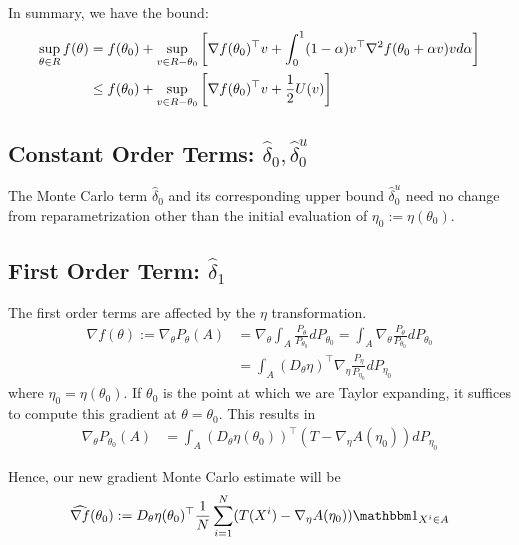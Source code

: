 \documentclass[10pt]{article}
\begin{document}
In summary, we have the bound:
\begin{align*}
    \sup\limits_{\theta \in R}
    f(\theta)
    &=
    f(\theta_0)
    +
    \sup\limits_{v \in R-\theta_0}
    \bracket{%
        \nabla f(\theta_0)^\top v
        +
        \int_0^1 (1-\alpha)
        v^\top \nabla^2 f(\theta_0 + \alpha v) v 
        d\alpha
    }
    \\&\leq
    f(\theta_0)
    +
    \sup\limits_{v \in R-\theta_0}
    \bracket{%
        \nabla f(\theta_0)^\top v
        +
        \frac{1}{2} U(v)
    }
\end{align*}

\subsection{Constant Order Terms: $\hat{\delta}_0, \hat{\delta}_0^u$}

The Monte Carlo term $\hat{\delta}_0$ and its corresponding upper bound
$\hat{\delta}_0^u$ need no change from reparametrization
other than the initial evaluation of $\eta_0 := \eta(\theta_0)$.

\subsection{First Order Term: $\hat{\delta}_1$}

The first order terms are affected by the $\eta$ transformation.
\begin{align*}
    \nabla f(\theta)
    :=
    \nabla_{\theta} P_\theta(A) 
    &=
    \nabla_{\theta} \int_A \frac{P_{\theta}}{P_{\theta_0}} dP_{\theta_0}
    =
    \int_A \nabla_{\theta} \frac{P_{\theta}}{P_{\theta_0}} dP_{\theta_0}
    \\&=
    \int_A (D_{\theta}\eta)^\top 
    \nabla_{\eta} \frac{P_{\eta}}{P_{\eta_0}} dP_{\eta_0}
\end{align*}
where $\eta_0 = \eta(\theta_0)$.
If $\theta_0$ is the point at which we are Taylor expanding,
it suffices to compute this gradient at $\theta = \theta_0$.
This results in
\begin{align*}
    \nabla_{\theta} P_{\theta_0}(A) 
    &=
    \int_A (D_{\theta}\eta(\theta_0))^\top (T - \nabla_\eta A(\eta_0)) dP_{\eta_0}
\end{align*}

Hence, our new gradient Monte Carlo estimate will be
\begin{align*}
    \widehat{\nabla f}(\theta_0)
    :=
    D_{\theta} \eta(\theta_0)^\top 
    \frac{1}{N}
    \sum\limits_{i=1}^N
    (T(X^i)-\nabla_\eta A(\eta_0)) \indic{X^i \in A}
\end{align*}
\end{document}
